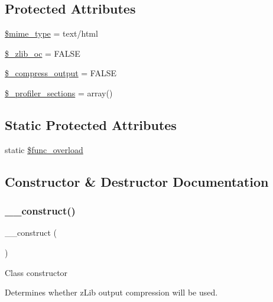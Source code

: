 \subsection*{Protected Attributes}
\begin{DoxyCompactItemize}
\item 
\mbox{\hyperlink{class_c_i___output_a4d1985caafb49b059e3ca3dedfee257a}{\$mime\+\_\+type}} = \textquotesingle{}text/html\textquotesingle{}
\item 
\mbox{\hyperlink{class_c_i___output_a76d91b71069ec82a31b4d12643e0ca40}{\$\+\_\+zlib\+\_\+oc}} = F\+A\+L\+SE
\item 
\mbox{\hyperlink{class_c_i___output_a9b8f5f282f8cf7b10d1b03b219df1386}{\$\+\_\+compress\+\_\+output}} = F\+A\+L\+SE
\item 
\mbox{\hyperlink{class_c_i___output_a4d239124375bbbdb9a4f5a0260505c40}{\$\+\_\+profiler\+\_\+sections}} = array()
\end{DoxyCompactItemize}
\subsection*{Static Protected Attributes}
\begin{DoxyCompactItemize}
\item 
static \mbox{\hyperlink{class_c_i___output_aef84be58d58a5895572c5689e56a1047}{\$func\+\_\+overload}}
\end{DoxyCompactItemize}


\subsection{Constructor \& Destructor Documentation}
\mbox{\label{class_c_i___output_a095c5d389db211932136b53f25f39685}} 
\subsubsection{\texorpdfstring{\+\_\+\+\_\+construct()}{\_\_construct()}}
{\footnotesize\ttfamily \+\_\+\+\_\+construct (\begin{DoxyParamCaption}{ }\end{DoxyParamCaption})}

Class constructor

Determines whether z\+Lib output compression will be used.

